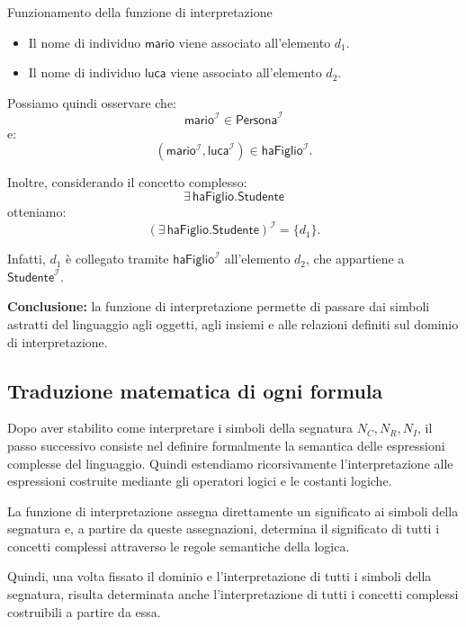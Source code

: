 \begin{example}{Funzionamento della funzione di interpretazione}
\begin{itemize}
        \item Il nome di individuo $\mathsf{mario}$
        viene associato all'elemento $d_1$.

        \item Il nome di individuo $\mathsf{luca}$
        viene associato all'elemento $d_2$.
    \end{itemize}

    Possiamo quindi osservare che:
    \[
        \mathsf{mario}^{\mathcal I}
        \in \mathsf{Persona}^{\mathcal I}
    \]
    e:
    \[
        (\mathsf{mario}^{\mathcal I},
         \mathsf{luca}^{\mathcal I})
        \in \mathsf{haFiglio}^{\mathcal I}.
    \]

    Inoltre, considerando il concetto complesso:
    \[
        \exists\,\mathsf{haFiglio}.\mathsf{Studente}
    \]
    otteniamo:
    \[
        (\exists\,\mathsf{haFiglio}.\mathsf{Studente})
        ^{\mathcal I}
        = \{d_1\}.
    \]

    Infatti, $d_1$ è collegato tramite
    $\mathsf{haFiglio}^{\mathcal I}$
    all'elemento $d_2$, che appartiene
    a $\mathsf{Studente}^{\mathcal I}$.

    \textbf{Conclusione:}
    la funzione di interpretazione permette
    di passare dai simboli astratti del linguaggio
    agli oggetti, agli insiemi e alle relazioni
    definiti sul dominio di interpretazione.
\end{example}


\subsection{Traduzione matematica di ogni formula}
Dopo aver stabilito come interpretare i simboli della segnatura \(N_C,N_R,N_I\), il passo successivo consiste nel definire formalmente la semantica delle espressioni complesse del linguaggio.
Quindi estendiamo ricorsivamente l'interpretazione alle espressioni costruite mediante gli operatori logici e le costanti logiche.

La funzione di interpretazione assegna direttamente un significato ai simboli della segnatura e, a partire da queste assegnazioni, determina il significato di tutti i concetti complessi attraverso le regole semantiche della logica.

Quindi, una volta fissato il dominio e l'interpretazione di tutti i simboli della segnatura, risulta determinata anche l'interpretazione di tutti i concetti complessi costruibili a partire da essa.

